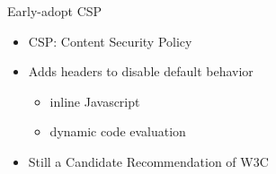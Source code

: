 \begin{frame}[plain]{Early-adopt CSP}
 \begin{itemize}[<+-| alert@+>]
  \item CSP: Content Security Policy
  \item Adds headers to disable default behavior
   \begin{itemize}[<+-| alert@+>]
     \item inline Javascript
     \item dynamic code evaluation
   \end{itemize}
  \item Still a Candidate Recommendation of W3C
 \end{itemize}
\end{frame}
